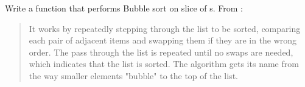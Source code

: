 \begin{Exercise}[title={Bubble sort},difficulty=5]
\label{ex:bubble}
\Question\label{ex:buble q1} Write a function that performs 
Bubble sort on slice of s. From \cite{bubblesort}:
\begin{quote}
It works by repeatedly stepping through the list to be sorted, comparing each
pair of adjacent items and swapping them if they are in the wrong order. The
pass through the list is repeated until no swaps are needed, which indicates
that the list is sorted. The algorithm gets its name from the way smaller
elements "bubble" to the top of the list. 
\end{quote}

\end{Exercise}

\begin{Answer}
\Question 
\end{Answer}
